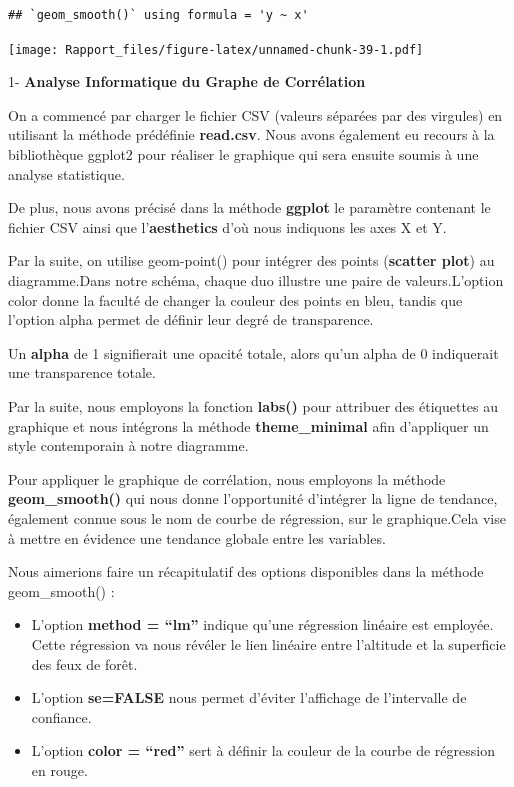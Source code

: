 \documentclass[
]{article}
\begin{document}
\begin{verbatim}
## `geom_smooth()` using formula = 'y ~ x'
\end{verbatim}

\texttt{[image: Rapport\_files/figure-latex/unnamed-chunk-39-1.pdf]}

1- \textbf{Analyse Informatique du Graphe de Corrélation }

On a commencé par charger le fichier CSV (valeurs séparées par des
virgules) en utilisant la méthode prédéfinie \textbf{read.csv}. Nous
avons également eu recours à la bibliothèque ggplot2 pour réaliser le
graphique qui sera ensuite soumis à une analyse statistique.

De plus, nous avons précisé dans la méthode \textbf{ggplot} le paramètre
contenant le fichier CSV ainsi que l'\textbf{aesthetics} d'où nous
indiquons les axes X et Y.

Par la suite, on utilise geom-point() pour intégrer des points
(\textbf{scatter plot}) au diagramme.Dans notre schéma, chaque duo
illustre une paire de valeurs.L'option color donne la faculté de changer
la couleur des points en bleu, tandis que l'option alpha permet de
définir leur degré de transparence.

Un \textbf{alpha} de 1 signifierait une opacité totale, alors qu'un
alpha de 0 indiquerait une transparence totale.

Par la suite, nous employons la fonction \textbf{labs()} pour attribuer
des étiquettes au graphique et nous intégrons la méthode
\textbf{theme\_minimal} afin d'appliquer un style contemporain à notre
diagramme.

Pour appliquer le graphique de corrélation, nous employons la méthode
\textbf{geom\_smooth()} qui nous donne l'opportunité d'intégrer la ligne
de tendance, également connue sous le nom de courbe de régression, sur
le graphique.Cela vise à mettre en évidence une tendance globale entre
les variables.

Nous aimerions faire un récapitulatif des options disponibles dans la
méthode geom\_smooth() :

\begin{itemize}
\item
  L'option \textbf{method = ``lm''} indique qu'une régression linéaire
  est employée. Cette régression va nous révéler le lien linéaire entre
  l'altitude et la superficie des feux de forêt.
\item
  L'option \textbf{se=FALSE} nous permet d'éviter l'affichage de
  l'intervalle de confiance.
\item
  L'option \textbf{color = ``red''} sert à définir la couleur de la
  courbe de régression en rouge.
\end{itemize}
\end{document}
